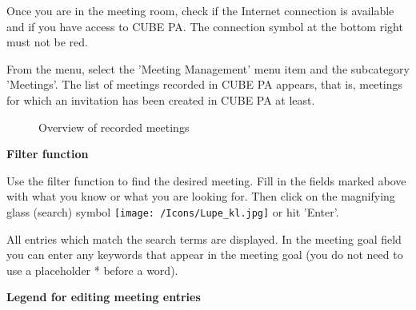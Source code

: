 Once you are in the meeting room, check if the Internet connection is available and if you have access to CUBE PA. The connection symbol at the bottom right must not be red.

\vspace{\baselineskip}

From the menu, select the 'Meeting Management' menu item and the subcategory 'Meetings'. The list of meetings recorded in CUBE PA appears, that is, meetings for which an invitation has been created in CUBE PA at least. 

\begin{figure}[H]
\caption{Overview of recorded meetings}
\end{figure}

\textbf{Filter function}

Use the filter function to find the desired meeting. Fill in the fields marked above with what you know or what you are looking for. Then click on the magnifying glass (search) symbol \texttt{[image: /Icons/Lupe\_kl.jpg]} or hit 'Enter'.

\vspace{\baselineskip}

All entries which match the search terms are displayed. In the meeting goal field you can enter any keywords that appear in the meeting goal (you do not need to use a placeholder * before a word).

\vspace{\baselineskip}

\textbf{Legend for editing meeting entries}

\vspace{\baselineskip}

